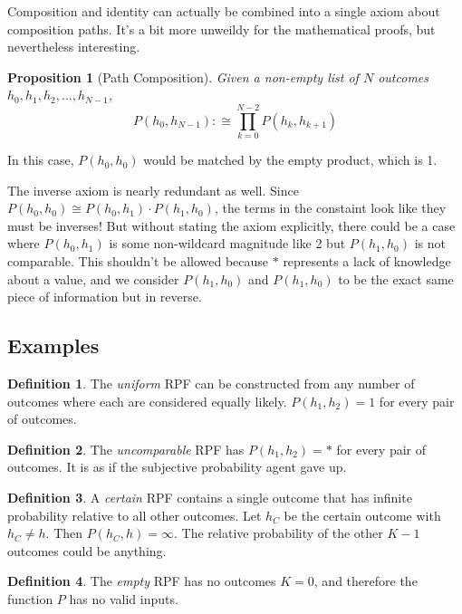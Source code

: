 \documentclass[twoside]{article}
\theoremstyle{plain}%
\newtheorem{proposition}[theorem]{Proposition}
\theoremstyle{definition}
\newtheorem{definition}{Definition}[section]
\theoremstyle{remark}
\begin{document}
Composition and identity can actually be combined into a single axiom about composition paths. It's a bit more unweildy for the mathematical proofs, but nevertheless interesting.

\begin{proposition}[Path Composition]
Given a non-empty list of \(N\) outcomes \(h_0, h_1, h_2, ..., h_{N-1}\), \[P(h_0, h_{N-1}) :\cong \prod_{k=0}^{N-2} P(h_k, h_{k+1}) \]
\end{proposition}

In this case, \(P(h_0, h_0)\) would be matched by the empty product, which is 1.

The inverse axiom is nearly redundant as well. Since \(P(h_0, h_0) \cong P(h_0, h_1) \cdot P(h_1, h_0)\), the terms in the constaint look like they must be inverses! But without stating the axiom explicitly, there could be a case where \(P(h_0, h_1)\) is some non-wildcard magnitude like 2 but \(P(h_1, h_0)\) is not comparable. This shouldn't be allowed because \(\ast\) represents a lack of knowledge about a value, and we consider \(P(h_1, h_0)\) and \(P(h_1, h_0)\) to be the exact same piece of information but in reverse.

\subsection{Examples}

\begin{definition}
\label{def:uniform_rpf}
The \textit{uniform} RPF can be constructed from any number of outcomes where each are considered equally likely. \(P(h_1, h_2) = 1\) for every pair of outcomes.
\end{definition}

\begin{definition}
\label{def:uncomparable_rpf}
The \textit{uncomparable} RPF has \(P(h_1, h_2) = \ast\) for every pair of outcomes. It is as if the subjective probability agent gave up.
\end{definition}

\begin{definition}
A \textit{certain} RPF contains a single outcome that has infinite probability relative to all other outcomes. Let \(h_C\) be the certain outcome with \(h_C \neq h\). Then \(P(h_C, h) = \infty\). The relative probability of the other \(K-1\) outcomes could be anything.
\end{definition}

\begin{definition}
\label{def:empty_rpf}
The \textit{empty} RPF has no outcomes \(K = 0\), and therefore the function \(P\) has no valid inputs.
\end{definition}
\end{document}
